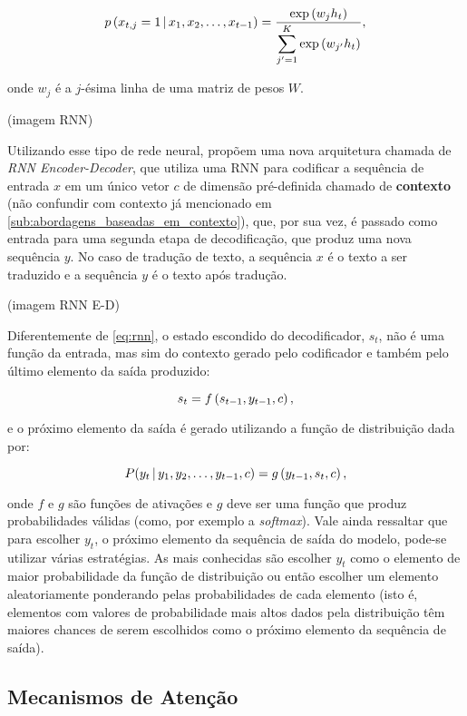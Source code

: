 \begin{equation}
  p\paren{x_{t,j}=1 \cond \seq{x}{t-1}} =
  \dfrac{\exp \paren{w_j h_t}}
  {\spsum{j'=1}{K}\exp\paren{w_{j'}h_t}},
\end{equation}

onde $w_j$ é a $j$-ésima linha de uma matriz de pesos $W$.

(imagem RNN)

Utilizando esse tipo de rede neural, \cite{cho-etal:2014:rnn-encoder-decoder}
propõem uma nova arquitetura chamada de \textit{RNN Encoder-Decoder}, que
utiliza uma RNN para codificar a sequência de entrada $x$ em um único vetor $c$
de dimensão pré-definida chamado de \textbf{contexto} (não confundir com
contexto já mencionado em \ref{sub:abordagens_baseadas_em_contexto}), que, por
sua vez, é passado como entrada para uma segunda etapa de decodificação, que
produz uma nova sequência $y$. No caso de tradução de texto, a sequência $x$ é o
texto a ser traduzido e a sequência $y$ é o texto após tradução.

(imagem RNN E-D)

Diferentemente de \ref{eq:rnn}, o estado escondido do decodificador, $s_t$, não
é uma função da entrada, mas sim do contexto gerado pelo codificador e também
pelo último elemento da saída produzido:

\begin{equation}
s_t = f\paren{s_{t-1}, y_{t-1}, c},
\label{rnn-decoder}
\end{equation}

e o próximo elemento da saída é gerado utilizando a função de distribuição dada
por:

\begin{equation}
P(y_t\cond\seq{y}{t-1},c)=g\paren{y_{t-1},s_t,c},
\end{equation}

onde $f$ e $g$ são funções de ativações e $g$ deve ser uma função que produz
probabilidades válidas (como, por exemplo a \textit{softmax}). Vale ainda
ressaltar que para escolher $y_t$, o próximo elemento da sequência de saída do
modelo, pode-se utilizar várias estratégias. As mais conhecidas são escolher
$y_t$ como o elemento de maior probabilidade da função de distribuição ou então
escolher um elemento aleatoriamente ponderando pelas probabilidades de cada
elemento (isto é, elementos com valores de probabilidade mais altos dados pela
distribuição têm maiores chances de serem escolhidos como o próximo elemento da
sequência de saída).

\subsection{Mecanismos de Atenção}%
\label{sub:mecanismos_de_atencao}


